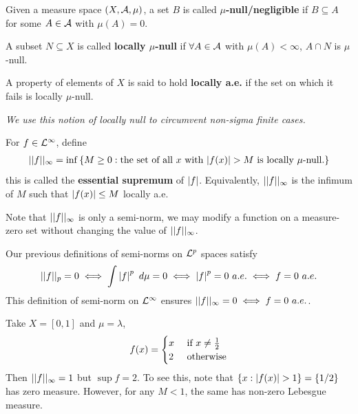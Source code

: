 \documentclass[11pt]{article}
\begin{document}
	\begin{definition}
		Given a measure space $(X, \mathcal{{A}}, \mu)$, a set $B$ is called \textbf{$\mu$-null/negligible} if $B \subseteq A$ for some $A \in \mathcal{{A}}$ with $\mu(A) = 0$.
		
		A subset $N \subseteq X$ is called \textbf{locally $\mu$-null} if $\forall A \in \mathcal{{A}}$ with $\mu(A) < \infty$, $A \cap N$ is $\mu$-null.
		
		A property of elements of $X$ is said to hold \textbf{locally a.e.} if the set on which it fails is locally $\mu$-null.
	\end{definition}
	\emph{We use this notion of locally null to circumvent non-sigma finite cases.}
	
	\begin{definition}
		For $f \in \mathcal{{L}}^\infty$, define
		\begin{align}
			\vert \vert {f} \vert \vert_\infty = \inf \left\{
			M \geq 0 : \text{{the set of all $x$ with $\left \vert {f(x)} \right \vert > M$ is locally $\mu$-null.}}
			\right\}
		\end{align}
		this is called the \textbf{essential supremum} of $\left \vert {f} \right \vert$. Equivalently, $\vert \vert {f} \vert \vert_\infty$ is the infimum of $M$ such that $\left \vert {f(x)} \right \vert \leq M$ locally a.e.
		
		Note that $\vert \vert {f} \vert \vert_\infty$ is only a semi-norm, we may modify a function on a measure-zero set without changing the value of $\vert \vert {f} \vert \vert_\infty$.
		
		Our previous definitions of semi-norms on $\mathcal{{L}}^p$ spaces satisfy
		\begin{align}
			\vert \vert {f} \vert \vert_p = 0 \iff \int \left \vert {f} \right \vert^p\ d\mu = 0 \iff \left \vert {f} \right \vert^p = 0\ a.e. \iff f = 0\ a.e.
		\end{align}
		This definition of semi-norm on $\mathcal{{L}}^\infty$ ensures $\vert \vert {f} \vert \vert_\infty = 0 \iff f = 0\ a.e.$.
	\end{definition}
	
	\begin{example}
		Take $X = [0, 1]$ and $\mu = \lambda$,
		\begin{align}
			f(x) = \begin{cases}
				x &\text{{ if }} x \neq \frac{1}{2} \\
				2 &\text{{ otherwise}}
			\end{cases}
		\end{align}
		Then $\vert \vert {f} \vert \vert_\infty=1$ but $\sup f = 2$. To see this, note that $\{x : \left \vert {f(x)} \right \vert > 1\} = \{1/2\}$ has zero measure. However, for any $M < 1$, the same has non-zero Lebesgue measure.
	\end{example}
	
\end{document}
